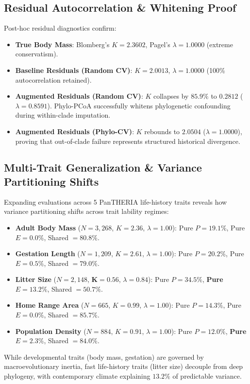 \documentclass[sigconf,nonacm]{acmart}
\begin{document}
\subsection{Residual Autocorrelation & Whitening Proof}
Post-hoc residual diagnostics confirm:
\begin{itemize}
    \item \textbf{True Body Mass}: Blomberg's $K = 2.3602$, Pagel's $\lambda = 1.0000$ (extreme conservatism).
    \item \textbf{Baseline Residuals (Random CV)}: $K = 2.0013$, $\lambda = 1.0000$ (100\% autocorrelation retained).
    \item \textbf{Augmented Residuals (Random CV)}: $K$ collapses by \textbf{$85.9\%$} to $\mathbf{0.2812}$ ($\lambda = 0.8591$). Phylo-PCoA successfully whitens phylogenetic confounding during within-clade imputation.
    \item \textbf{Augmented Residuals (Phylo-CV)}: $K$ rebounds to $\mathbf{2.0504}$ ($\lambda = 1.0000$), proving that out-of-clade failure represents structured historical divergence.
\end{itemize}

\subsection{Multi-Trait Generalization & Variance Partitioning Shifts}
Expanding evaluations across 5 PanTHERIA life-history traits reveals how variance partitioning shifts across trait lability regimes:
\begin{itemize}
    \item \textbf{Adult Body Mass} ($N=3,268$, $K=2.36$, $\lambda=1.00$): Pure $P = 19.1\%$, Pure $E = 0.0\%$, Shared $= 80.8\%$.
    \item \textbf{Gestation Length} ($N=1,209$, $K=2.61$, $\lambda=1.00$): Pure $P = 20.2\%$, Pure $E = 0.5\%$, Shared $= 79.0\%$.
    \item \textbf{Litter Size} ($N=2,148$, $\mathbf{K=0.56}$, $\lambda=0.84$): Pure $P = 34.5\%$, \textbf{Pure $E = 13.2\%$}, Shared $= 50.7\%$.
    \item \textbf{Home Range Area} ($N=665$, $K=0.99$, $\lambda=1.00$): Pure $P = 14.3\%$, Pure $E = 0.0\%$, Shared $= 85.7\%$.
    \item \textbf{Population Density} ($N=884$, $K=0.91$, $\lambda=1.00$): Pure $P = 12.0\%$, \textbf{Pure $E = 2.3\%$}, Shared $= 84.0\%$.
\end{itemize}
While developmental traits (body mass, gestation) are governed by macroevolutionary inertia, fast life-history traits (litter size) decouple from deep phylogeny, with contemporary climate explaining \textbf{$13.2\%$} of predictable variance.
\end{document}
